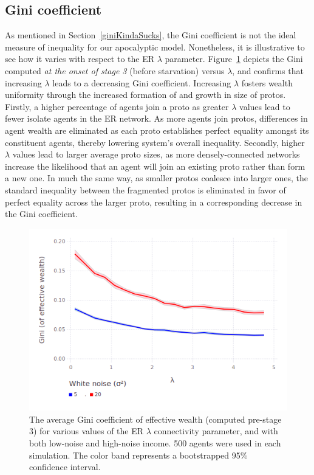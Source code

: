 \subsection{Gini coefficient}

As mentioned in Section~\ref{giniKindaSucks}, the Gini coefficient is not the ideal measure of inequality for our apocalyptic model. Nonetheless, it is illustrative to see how it varies with respect to the ER $\lambda$ parameter. Figure~\ref{fig:giniVsLambda} depicts the Gini computed \textit{at the onset of stage 3} (before starvation) versus $\lambda$, and confirms that increasing $\lambda$ leads to a decreasing Gini coefficient. Increasing $\lambda$ fosters wealth uniformity through the increased formation of and growth in size of protos. Firstly, a higher percentage of agents join a proto as greater $\lambda$ values lead to fewer isolate agents in the ER network. As more agents join protos, differences in agent wealth are eliminated as each proto establishes perfect equality amongst its constituent agents, thereby lowering system's overall inequality. Secondly, higher $\lambda$ values lead to larger average proto sizes, as more densely-connected networks increase the likelihood that an agent will join an existing proto rather than form a new one. In much the same way, as smaller protos coalesce into larger ones, the standard inequality between the fragmented protos is eliminated in favor of perfect equality across the larger proto, resulting in a corresponding decrease in the Gini coefficient. 

\begin{figure}[hb]
\centering
\includegraphics[width=\columnwidth]{figures/giniVsLambda.png}
\caption{The average Gini coefficient of effective wealth (computed pre-stage 3) for various values of the ER $\lambda$ connectivity parameter, and with both low-noise and high-noise income. 500 agents were used in each simulation. The color band represents a bootstrapped 95\% confidence interval.}
\label{fig:giniVsLambda}
\end{figure}

